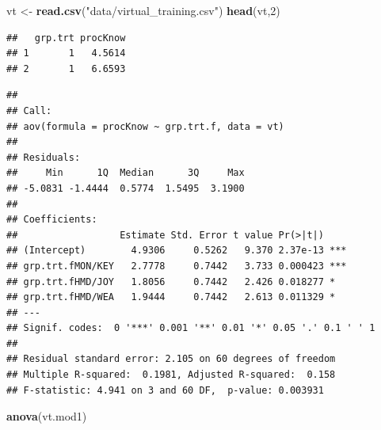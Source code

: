 \documentclass[
]{book}
\newenvironment{Shaded}{\begin{snugshade}}{\end{snugshade}}
\newcommand{\AttributeTok}[1]{\textcolor[rgb]{0.13,0.29,0.53}{#1}}
\newcommand{\DecValTok}[1]{\textcolor[rgb]{0.00,0.00,0.81}{#1}}
\newcommand{\FunctionTok}[1]{\textcolor[rgb]{0.13,0.29,0.53}{\textbf{#1}}}
\newcommand{\NormalTok}[1]{#1}
\newcommand{\OtherTok}[1]{\textcolor[rgb]{0.56,0.35,0.01}{#1}}
\newcommand{\SpecialCharTok}[1]{\textcolor[rgb]{0.81,0.36,0.00}{\textbf{#1}}}
\newcommand{\StringTok}[1]{\textcolor[rgb]{0.31,0.60,0.02}{#1}}
\begin{document}
\begin{Shaded}
\begin{Highlighting}[]
\NormalTok{vt }\OtherTok{\textless{}{-}} \FunctionTok{read.csv}\NormalTok{(}\StringTok{"data/virtual\_training.csv"}\NormalTok{)}
\FunctionTok{head}\NormalTok{(vt,}\DecValTok{2}\NormalTok{)}
\end{Highlighting}
\end{Shaded}

\begin{verbatim}
##   grp.trt procKnow
## 1       1   4.5614
## 2       1   6.6593
\end{verbatim}

\begin{Shaded}
\end{Shaded}

\begin{verbatim}
## 
## Call:
## aov(formula = procKnow ~ grp.trt.f, data = vt)
## 
## Residuals:
##     Min      1Q  Median      3Q     Max 
## -5.0831 -1.4444  0.5774  1.5495  3.1900 
## 
## Coefficients:
##                  Estimate Std. Error t value Pr(>|t|)    
## (Intercept)        4.9306     0.5262   9.370 2.37e-13 ***
## grp.trt.fMON/KEY   2.7778     0.7442   3.733 0.000423 ***
## grp.trt.fHMD/JOY   1.8056     0.7442   2.426 0.018277 *  
## grp.trt.fHMD/WEA   1.9444     0.7442   2.613 0.011329 *  
## ---
## Signif. codes:  0 '***' 0.001 '**' 0.01 '*' 0.05 '.' 0.1 ' ' 1
## 
## Residual standard error: 2.105 on 60 degrees of freedom
## Multiple R-squared:  0.1981, Adjusted R-squared:  0.158 
## F-statistic: 4.941 on 3 and 60 DF,  p-value: 0.003931
\end{verbatim}

\begin{Shaded}
\begin{Highlighting}[]
\FunctionTok{anova}\NormalTok{(vt.mod1)}
\end{Highlighting}
\end{Shaded}
\end{document}
